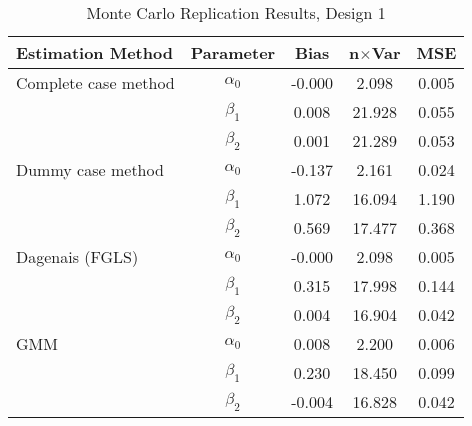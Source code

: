 \begin{table}
\centering
\caption{Monte Carlo Replication Results, Design 1}
\label{table:MCReplicationResultsDesign1}
\begin{tabular}{lcccc}
\toprule
Estimation Method & Parameter & Bias & n$\times$Var & MSE \\
\midrule
Complete case method & $\alpha_0$ & -0.000 & 2.098 & 0.005 \\
 & $\beta_1$ & 0.008 & 21.928 & 0.055 \\
 & $\beta_2$ & 0.001 & 21.289 & 0.053 \\
Dummy case method & $\alpha_0$ & -0.137 & 2.161 & 0.024 \\
 & $\beta_1$ & 1.072 & 16.094 & 1.190 \\
 & $\beta_2$ & 0.569 & 17.477 & 0.368 \\
Dagenais (FGLS) & $\alpha_0$ & -0.000 & 2.098 & 0.005 \\
 & $\beta_1$ & 0.315 & 17.998 & 0.144 \\
 & $\beta_2$ & 0.004 & 16.904 & 0.042 \\
GMM & $\alpha_0$ & 0.008 & 2.200 & 0.006 \\
 & $\beta_1$ & 0.230 & 18.450 & 0.099 \\
 & $\beta_2$ & -0.004 & 16.828 & 0.042 \\
\bottomrule
\end{tabular}
\end{table}
